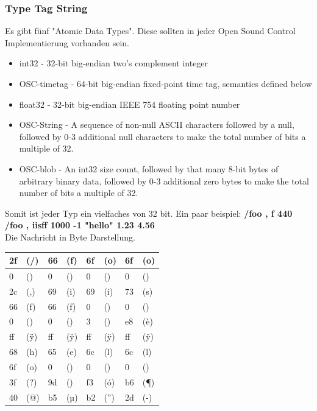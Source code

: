 \documentclass[a4paper, 12pt]{article}
\begin{document}
\subsubsection{Type Tag String}
Es gibt fünf "Atomic Data Types"\cite{OSCspec}. Diese sollten in jeder Open Sound Control Implementierung vorhanden sein.
\begin{itemize}
	\item int32 - 32-bit big-endian two's complement integer
	\item OSC-timetag - 64-bit big-endian fixed-point time tag, semantics defined below
	\item float32 - 32-bit big-endian IEEE 754 floating point number
	\item OSC-String - A sequence of non-null ASCII characters followed by a null, followed by 0-3 additional null characters to make the total number of bits a multiple of 32.
	\item OSC-blob - An int32 size count, followed by that many 8-bit bytes of arbitrary binary data, followed by 0-3 additional zero bytes to make the total number of bits a multiple of 32.
\end{itemize}
Somit ist jeder Typ ein vielfaches von 32 bit. Ein paar beispiel:
\newpage
{\bf /foo , f 440}\\
{\bf /foo , iisff 1000 -1 "hello" 1.23 4.56}
\\
Die Nachricht in Byte Darstellung.
\begin{table}[ht]
\centering
\begin{tabular}{|p{1.5cm}|p{1.5cm}|p{1.5cm}|p{1.5cm}|p{1.5cm}|p{1.5cm}|p{1.5cm}|p{1.5cm}|}
\hline
 2f & (/) & 66 & (f) & 6f & (o) & 6f & (o)\\ \hline
 0 & () & 0 & () & 0 & () & 0 & ()\\ \hline
 2c & (,) & 69 & (i) & 69 & (i) & 73 & (s) \\
 66 & (f) & 66 & (f) & 0 & () & 0 & () \\ \hline
 0 & () & 0 & () & 3 & () & e8 & (è) \\ \hline
 ff & (ÿ) & ff & (ÿ) & ff & (ÿ) & ff & (ÿ) \\
 68 & (h) & 65 & (e) & 6c & (l) & 6c & (l) \\ \hline
 6f & (o) & 0 & () & 0 & () & 0 & () \\ \hline
 3f & (?) & 9d & () & f3 & (ó) & b6 & (¶) \\ \hline
 40 & (@) & b5 & (µ) & b2 & (”) & 2d & (-) \\ \hline
\end{tabular}
\end{table}
\newpage
\renewcommand{\refname}{REFERENCES}



\listoffigures
\end{document}
